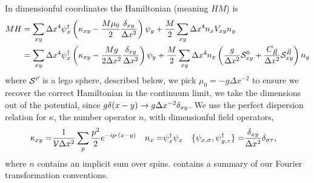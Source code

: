 In dimensionful coordinates the Hamiltonian (meaning $HM$) is
\begin{align}
	MH &= \sum_{xy}\Delta x^4 \psi{}^{\dagger}_x \left(\kappa_{xy} - \frac{M\mu_0}{2} \frac{\delta_{xy}}{\Delta x^2} \right)\psi_y + \frac{M}{2} \sum_{xy} \Delta x^4 n_x V_{xy} n_y
	\nonumber\\
	&= 
	\sum_{xy}\Delta x^4 \psi{}^{\dagger}_x \left(\kappa_{xy} - \frac{M g}{2 \Delta x^2} \frac{\delta_{xy}}{\Delta x^2}\right) \psi_y
	+ \frac{M}{2} \sum_{xy} \Delta x^4 n_x \left( \frac{g}{\Delta x^2} \mathcal{S}^{0}_{xy} + \frac{C_{\vec{R}}}{\Delta x^2} \mathcal{S}^{\vec{R}}_{xy} \right) n_y
\end{align}
where $\mathcal{S}^{\vec{r}}$ is a lego sphere, described below, we pick $\mu_0 = -g \Delta x^{-2}$ to ensure we recover the correct Hamiltonian in the continuum limit, we take the dimensions out of the potential, since $g\delta(x-y) \rightarrow g \Delta x^{-2} \delta_{xy}$.
We use the perfect dispersion relation for $\kappa$, the number operator $n$, with dimensionful field operators,
\begin{align}
    \kappa_{xy} =& \frac{1}{\mathcal{V} \Delta x^2} \sum_{p} \frac{p^2}{2} e^{-i p \cdot (x-y)}
	&
	n_x =& \psi{}^{\dagger}_x \psi_x
	&
	\{\psi_{x,\sigma}, \psi{}^{\dagger}_{y,\tau} \} =& \frac{\delta_{xy}}{\Delta x^2} \delta_{\sigma\tau},
\end{align}
where $n$ contains an implicit sum over spins.
 contains a summary of our Fourier transformation conventions.


